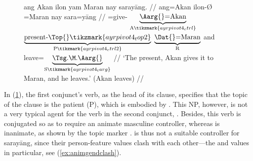 \begin{figure}[h]
\ex\label{ex:ayrpivot4}\begingl[aboveglcskip=1.5em, aboveglftskip=2.5em]
	 {ang Akan} ilon {yam Maran} nay sarayāng. //
	 {ang=Akan} ilon-Ø {\Dat{}=Maran} nay sara=yāng //
	\glc \PatTI{}=give-\TsgM{}
		$\underbrace{\text{\Aarg{}=Akan}}_{\text{A}\tikzmark{ayrpivot4_ctrl}}$
		$\underbrace{\text{\smash{present}-\Top{}}\tikzmark{ayrpivot4_top2}}_%
			{\text{P}\tikzmark{ayrpivot4_ctrl2}}$
		$\underbrace{\text{\Dat{}=Maran}}_{\text{R}}$
		and
		leave=$\underbrace{\text{\smash{\TsgM{}}.\Aarg{}}}_%
			{\text{S}\tikzmark{ayrpivot4_targ}}$
		//
	\glft `The present, Akan gives it to Maran, and he leaves.' 
		(Akan leaves) //
\endgl
{}
\xe
\end{figure}

In (\ref{ex:ayrpivot4}), the first conjunct's verb, as the head of its clause,
specifies that the topic of the clause is the patient (P), which is embodied by
. This NP, however, is not a very typical agent for
the verb in the second conjunct, . Besides, this verb is
conjugated so as to require an animate masculine controller, whereas
 is inanimate, as shown by the topic marker .
 is thus not a suitable controller for 
{sarayāng}, since their person-feature values clash with each other---the
\Anim{} and \Gend{} values in particular, see (\ref{ex:animgendclash}).

